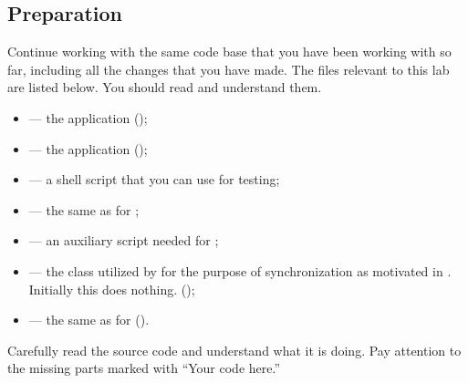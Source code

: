\documentclass[a4paper]{article}
\begin{document}
\subsection{Preparation}
Continue working with the same code base that you have been working
with so far, including all the changes that you have made. The files
relevant to this lab are listed below. You should read and understand
them.
\begin{itemize}

  \item {} --- the  application (\fix);

  \item {} --- the  application (\fix);

  \item {} --- a shell script that you can use for testing;

  \item {} --- the same as for ;

  \item {} --- an auxiliary script needed for
  ;

  \item {} --- the class utilized
  by  for the purpose of synchronization as motivated in
  . Initially this does nothing. (\fix);

  \item {} --- the same as for 
  (\overwrite).

\end{itemize}

Carefully read the source code and understand what it is doing. Pay
attention to the missing parts marked with ``Your code here.''
\end{document}
